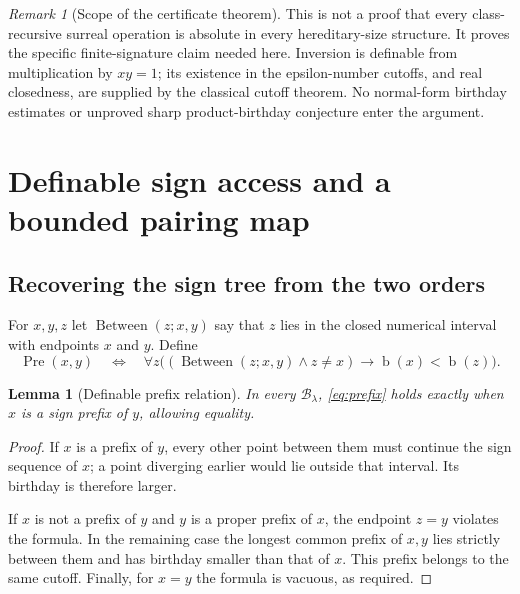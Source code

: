 \documentclass[11pt,letterpaper]{article}
\newtheorem{lemma}[theorem]{Lemma}
\theoremstyle{definition}
\theoremstyle{remark}
\newtheorem{remark}[theorem]{Remark}
\newcommand{\bd}{\operatorname{b}}
\newcommand{\B}{\mathcal B}
\newcommand{\Pre}{\operatorname{Pre}}
\begin{document}
\begin{remark}[Scope of the certificate theorem]
This is not a proof that every class-recursive surreal operation is absolute
in every hereditary-size structure. It proves the specific finite-signature
claim needed here. Inversion is definable from multiplication by $xy=1$;
its existence in the epsilon-number cutoffs, and real closedness, are supplied
by the classical cutoff theorem. No normal-form birthday estimates or
unproved sharp product-birthday conjecture enter the argument.
\end{remark}

\section{Definable sign access and a bounded pairing map}
\label{sec:bits}

\subsection{Recovering the sign tree from the two orders}

For $x,y,z$ let $\operatorname{Between}(z;x,y)$ say that $z$ lies in the closed
numerical interval with endpoints $x$ and $y$. Define
\begin{equation}
 \Pre(x,y)\quad\Longleftrightarrow\quad
 \forall z\bigl((\operatorname{Between}(z;x,y)\land z\ne x)
                 \longrightarrow\bd(x)<\bd(z)\bigr).
 \label{eq:prefix}
\end{equation}

\begin{lemma}[Definable prefix relation]
\label{lem:prefix}
In every $\B_\lambda$, \eqref{eq:prefix} holds exactly when $x$ is a sign
prefix of $y$, allowing equality.
\end{lemma}
\begin{proof}
If $x$ is a prefix of $y$, every other point between them must continue the
sign sequence of $x$; a point diverging earlier would lie outside that
interval. Its birthday is therefore larger.

If $x$ is not a prefix of $y$ and $y$ is a proper prefix of $x$, the endpoint
$z=y$ violates the formula. In the remaining case the longest common prefix
of $x,y$ lies strictly between them and has birthday smaller than that of
$x$. This prefix belongs to the same cutoff. Finally, for $x=y$ the formula
is vacuous, as required.
\end{proof}
\end{document}

